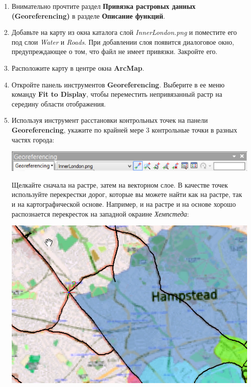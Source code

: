 \documentclass[]{book}
\theoremstyle{definition}
\theoremstyle{definition}
\theoremstyle{definition}
\theoremstyle{remark}
\begin{document}
\begin{enumerate}
\def\labelenumi{\arabic{enumi}.}
\item
  Внимательно прочтите раздел \textbf{Привязка растровых данных
  (Georeferencing)} в разделе \textbf{Описание функций}.
\item
  Добавьте на карту из окна каталога слой \emph{InnerLondon.png} и
  поместите его под слои \emph{Water} и \emph{Roads}. При добавлении
  слоя появится диалоговое окно, предупреждающее о том, что файл не
  имеет привязки. Закройте его.
\item
  Расположите карту в центре окна \textbf{ArcMap}.
\item
  Откройте панель инструментов \textbf{Georeferencing}. Выберите в ее
  меню команду \textbf{Fit to Display}, чтобы переместить непривязанный
  растр на середину области отображения.
\item
  Используя инструмент расстановки контрольных точек на панели
  \textbf{Georeferencing}, укажите по крайней мере 3 контрольные точки в
  разных частях города:

  \includegraphics{images/Ex07/image8.png}

  Щелкайте сначала на растре, затем на векторном слое. В качестве точек
  используйте перекрестки дорог, которые вы можете найти как на растре,
  так и на картографической основе. Например, и на растре и на основе
  хорошо распознается перекресток на западной окраине \emph{Хемпстеда}:

  \includegraphics{images/Ex07/image9.png}


\end{enumerate}
\end{document}
